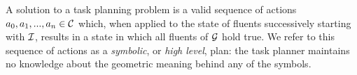 A solution to a task planning problem is a valid sequence of actions
$a_{0}, a_{1}, ..., a_{n} \in \mathcal{C}$ which, when applied to the state of fluents
successively starting with $\mathcal{I}$, results in a state in which all fluents of
$\mathcal{G}$ hold true. We refer to this sequence of actions as a \emph{symbolic}, or
\emph{high level}, plan: the task planner maintains no knowledge about the geometric meaning
behind any of the symbols.







